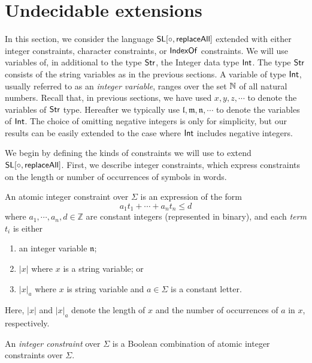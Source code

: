 
\section{Undecidable extensions}

In this section, we consider the language $\mathsf{SL}[\circ,\mathsf{replaceAll}]$ extended with either integer constraints, character constraints, or $\mathsf{IndexOf}$ constraints. 
We will use variables of, in additional to the type ${\sf Str}$, the Integer data type ${\sf Int}$. The type ${\sf Str}$ consists of the string variables as in the previous sections. A variable of type ${\sf Int}$, usually referred to as an \emph{integer variable}, ranges over the set $\mathbb{N}$ of all natural numbers. Recall that, in previous sections, we have used $x, y, z, \cdots$ to denote the variables of ${\sf Str}$ type.  Hereafter we typically use $\mathfrak{l}, \mathfrak{m}, \mathfrak{n}, \cdots$ to denote the variables of ${\sf Int}$. The
choice of omitting negative integers is only for simplicity, but our
results can be easily extended to the case where ${\sf Int}$ includes negative integers.

We begin by defining the kinds of constraints we will use to extend $\mathsf{SL}[\circ,\mathsf{replaceAll}]$.
First, we describe integer constraints, which express constraints on the length or number of occurrences of symbols in words. 


\begin{definition} \label{def:intconst} 
	An atomic integer constraint over $\Sigma$ is an expression of the form
	\[a_1t_1+\cdots+a_nt_n\leq d\]
where $a_1, \cdots, a_n,d\in \mathbb{Z}$ are constant integers (represented in binary), and each \emph{term} $t_i$ is either 
	\begin{enumerate}
		\item an integer variable $\mathfrak{n}$;
		\item $|x|$ where $x$ is a  string variable; or 
		\item $|x|_a$ where $x$ is string variable and $a\in \Sigma$ is a constant letter.
	\end{enumerate}
Here, $|x|$ and $|x|_a$ denote the length of $x$ and the number of occurrences of $a$ in $x$, respectively. 

An \emph{integer constraint} over $\Sigma$ is a Boolean combination of atomic integer constraints over $\Sigma$.
\end{definition}

